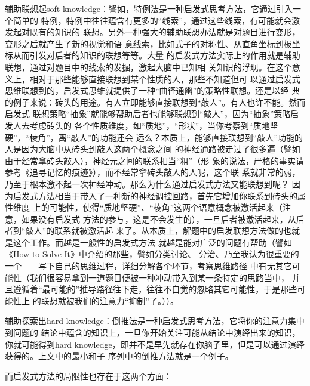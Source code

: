\documentclass[11pt]{article}
\begin{document}
\begin{itemize}
辅助联想起soft knowledge：譬如，特例法是一种启发式思考方法，它通过引入一个简单的
特例，特例中往往蕴含有更多的“线索”，通过这些线索，有可能就会激发起对既有的知识的
联想。另外一种强大的辅助联想办法就是对题目进行变形，变形之后就产生了新的视觉和语
意线索，比如式子的对称性、从直角坐标到极坐标从而引发对后者的知识的联想等等。大量
的启发式方法实际上的作用就是辅助联想，通过对题目中的线索的发掘，激起大脑中已知相
关知识的浮现。在这个意义上，相对于那些能够直接联想到某个性质的人，那些不知道但可
以通过启发式思维联想到的，启发式思维就提供了一种“曲径通幽”的策略性联想。还是以经
典的例子来说：砖头的用途。有人立即能够直接联想到“敲人”。有人也许不能。然而启发式
联想策略“抽象”就能够帮助后者也能够联想到“敲人”，因为“抽象”策略启发人去考虑砖头的
各个性质维度，如“质地”，“形状”，当你考察到“质地坚硬”，“棱角”，离“敲人”的功能还会
远么？本质上，能够直接联想到“敲人”功能的人是因为大脑中从砖头到敲人这两个概念之间
的神经通路被走过了很多遍（譬如由于经常拿砖头敲人），神经元之间的联系相当“粗”（形
象的说法，严格的事实请参考《追寻记忆的痕迹》），而不经常拿砖头敲人的人呢，这个联
系就非常的弱，乃至于根本激不起一次神经冲动。那么为什么通过启发式方法又能联想到呢？
因为启发式方法相当于带入了一种新的神经调控回路，首先它增加你联系到砖头的属性维度
上的可能性，使得“质地坚硬”、“棱角”这两个语意概念被激活起来（注意，如果没有启发式
方法的参与，这是不会发生的），一旦后者被激活起来，从后者到“敲人”的联系就被激活起
来了。从本质上，解题中的启发联想方法做的也就是这个工作。而越是一般性的启发式方法
就越是能对广泛的问题有帮助（譬如《How to Solve It》中介绍的那些，譬如分类讨论、
分治、乃至我认为很重要的一个——写下自己的思维过程，详细分解各个环节，考察思维路径
中有无其它可能性（我们很容易拿到一道题目便被一种冲动带入到某一条特定的思路当中，
并且遵循着“最可能的”推导路径往下走，往往不自觉的忽略其它可能性，于是那些可能性上
的联想就被我们的注意力“抑制”了。））。

辅助探索出hard knowledge：倒推法是一种启发式思考方法，它将你的注意力集中到问题的
结论中蕴含的知识上，一旦你开始关注可能从结论中演绎出来的知识，你就可能得到hard
knowledge，即并不是早先就存在你脑子里，但是可以通过演绎获得的。上文中的最小和子
序列中的倒推方法就是一个例子。


而启发式方法的局限性也存在于这两个方面：


\end{itemize}
\end{document}
